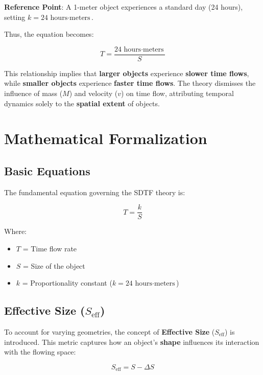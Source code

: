 \documentclass[12pt]{article}
\begin{document}
\textbf{Reference Point}: A 1-meter object experiences a standard day (24 hours), setting \( k = 24 \, \text{hours$\cdot$meters} \).

Thus, the equation becomes:

\begin{equation}
    T = \frac{24 \, \text{hours$\cdot$meters}}{S}
\end{equation}

This relationship implies that \textbf{larger objects} experience \textbf{slower time flows}, while \textbf{smaller objects} experience \textbf{faster time flows}. The theory dismisses the influence of mass (\( M \)) and velocity (\( v \)) on time flow, attributing temporal dynamics solely to the \textbf{spatial extent} of objects.

\section{Mathematical Formalization}

\subsection{Basic Equations}

The fundamental equation governing the SDTF theory is:

\begin{equation}
    T = \frac{k}{S}
\end{equation}

Where:
\begin{itemize}
    \item \( T \) = Time flow rate
    \item \( S \) = Size of the object
    \item \( k \) = Proportionality constant (\( k = 24 \, \text{hours$\cdot$meters} \))
\end{itemize}

\subsection{Effective Size (\( S_{\text{eff}} \))}

To account for varying geometries, the concept of \textbf{Effective Size} (\( S_{\text{eff}} \)) is introduced. This metric captures how an object's \textbf{shape} influences its interaction with the flowing space:

\begin{equation}
    S_{\text{eff}} = S - \Delta S
\end{equation}
\end{document}
